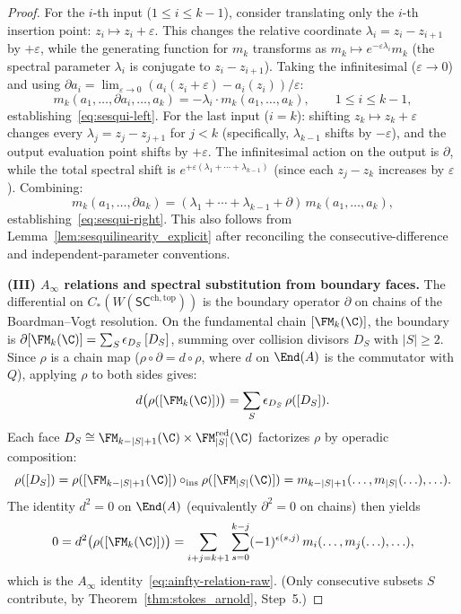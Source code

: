 \begin{proof}
For the $i$-th input ($1 \leq i \leq k-1$), consider translating only the $i$-th insertion point: $z_i \mapsto z_i + \varepsilon$. This changes the relative coordinate $\lambda_i = z_i - z_{i+1}$ by $+\varepsilon$, while the generating function for $m_k$ transforms as $m_k \mapsto e^{-\varepsilon \lambda_i} m_k$ (the spectral parameter $\lambda_i$ is conjugate to $z_i - z_{i+1}$). Taking the infinitesimal ($\varepsilon \to 0$) and using $\partial a_i = \lim_{\varepsilon \to 0}(a_i(z_i+\varepsilon) - a_i(z_i))/\varepsilon$:
\[
m_k(a_1,\ldots,\partial a_i,\ldots,a_k) = -\lambda_i \cdot m_k(a_1,\ldots,a_k), \qquad 1 \leq i \leq k-1,
\]
establishing~\eqref{eq:sesqui-left}. For the last input ($i = k$): shifting $z_k \mapsto z_k + \varepsilon$ changes every $\lambda_j = z_j - z_{j+1}$ for $j < k$ (specifically, $\lambda_{k-1}$ shifts by $-\varepsilon$), and the output evaluation point shifts by $+\varepsilon$. The infinitesimal action on the output is $\partial$, while the total spectral shift is $e^{+\varepsilon(\lambda_1+\cdots+\lambda_{k-1})}$ (since each $z_j - z_k$ increases by $\varepsilon$). Combining:
\[
m_k(a_1,\ldots,\partial a_k) = (\lambda_1 + \cdots + \lambda_{k-1} + \partial)\, m_k(a_1,\ldots,a_k),
\]
establishing~\eqref{eq:sesqui-right}. This also follows from Lemma~\ref{lem:sesquilinearity_explicit} after reconciling the consecutive-difference and independent-parameter conventions.

\medskip
\textbf{(III) $A_\infty$ relations and spectral substitution from boundary faces.}
The differential on $C_\ast(W(\mathsf{SC}^{\mathrm{ch,top}}))$ is the boundary operator $\partial$ on chains of the Boardman--Vogt resolution. On the fundamental chain $[\FM_k(\C)]$, the boundary is $\partial[\FM_k(\C)] = \sum_S \epsilon_{D_S}\,[D_S]$, summing over collision divisors $D_S$ with $|S| \geq 2$. Since $\rho$ is a chain map ($\rho \circ \partial = d \circ \rho$, where $d$ on $\End(A)$ is the commutator with $Q$), applying $\rho$ to both sides gives:
\[
d\bigl(\rho([\FM_k(\C)])\bigr) = \sum_S \epsilon_{D_S}\, \rho([D_S]).
\]
Each face $D_S \cong \FM_{k-|S|+1}(\C) \times \FM_{|S|}^{\mathrm{red}}(\C)$ factorizes $\rho$ by operadic composition:
\[
\rho([D_S]) = \rho([\FM_{k-|S|+1}(\C)]) \circ_{\mathrm{ins}} \rho([\FM_{|S|}(\C)]) = m_{k-|S|+1}(\ldots, m_{|S|}(\ldots), \ldots).
\]
The identity $d^2 = 0$ on $\End(A)$ (equivalently $\partial^2 = 0$ on chains) then yields
\[
0 = d^2\bigl(\rho([\FM_k(\C)])\bigr) = \sum_{i+j=k+1}\sum_{s=0}^{k-j} (-1)^{\epsilon(s,j)}\, m_i(\ldots, m_j(\ldots), \ldots),
\]
which is the $A_\infty$ identity~\eqref{eq:ainfty-relation-raw}. (Only consecutive subsets $S$ contribute, by Theorem~\ref{thm:stokes_arnold}, Step~5.)


\end{proof}

